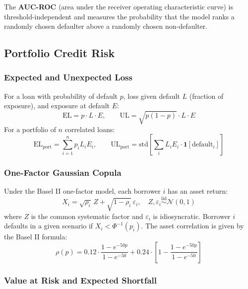 \documentclass[12pt,a4paper]{article}
\begin{document}
The \textbf{AUC-ROC} (area under the receiver operating characteristic curve)
is threshold-independent and measures the probability that the model ranks a
randomly chosen defaulter above a randomly chosen non-defaulter.

\subsection{Portfolio Credit Risk}

\subsubsection{Expected and Unexpected Loss}

For a loan with probability of default $p$, loss given default $L$ (fraction of
exposure), and exposure at default $E$:
\begin{equation}
  \text{EL} = p \cdot L \cdot E, \qquad
  \text{UL} = \sqrt{p(1-p)}\cdot L \cdot E
  \label{eq:el_ul}
\end{equation}
For a portfolio of $n$ correlated loans:
\begin{equation}
  \text{EL}_\text{port} = \sum_{i=1}^n p_i L_i E_i, \qquad
  \text{UL}_\text{port} = \text{std}\!\left[\sum_i L_i E_i \cdot \mathbf{1}[\text{default}_i]\right]
  \label{eq:port_loss}
\end{equation}

\subsubsection{One-Factor Gaussian Copula}

Under the Basel II one-factor model, each borrower $i$ has an asset return:
\begin{equation}
  X_i = \sqrt{\rho_i}\,Z + \sqrt{1-\rho_i}\,\varepsilon_i,
  \quad Z, \varepsilon_i \stackrel{\text{iid}}{\sim} \mathcal{N}(0,1)
  \label{eq:copula}
\end{equation}
where $Z$ is the common systematic factor and $\varepsilon_i$ is idiosyncratic.
Borrower $i$ defaults in a given scenario if $X_i < \Phi^{-1}(p_i)$. The
asset correlation is given by the Basel II formula:
\begin{equation}
  \rho(p) = 0.12\cdot\frac{1-e^{-50p}}{1-e^{-50}} + 0.24\cdot\left[1-\frac{1-e^{-50p}}{1-e^{-50}}\right]
  \label{eq:rho}
\end{equation}

\subsubsection{Value at Risk and Expected Shortfall}
\end{document}
